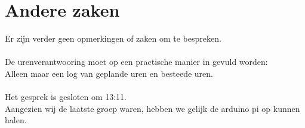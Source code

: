 \documentclass[dutch]{hu}
\begin{document}
	\section{Andere zaken}
	Er zijn verder geen opmerkingen of zaken om te bespreken.
	\paragraph{}
	De urenverantwooring moet op een practische manier in gevuld worden:\\
	Alleen maar een log van geplande uren en besteede uren.
	\paragraph{}
	Het gesprek is gesloten om 13:11.\\
	Aangezien wij de laatste groep waren, hebben we gelijk de arduino pi op kunnen halen.
\end{document}

